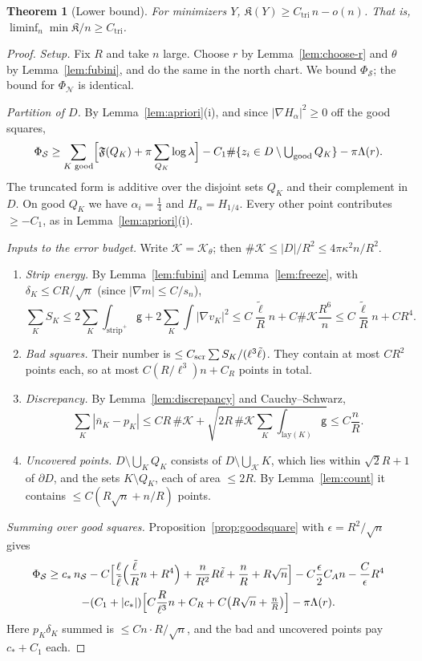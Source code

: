 \documentclass[11pt]{article}
\newtheorem{theorem}{Theorem}[section]
\theoremstyle{definition}
\theoremstyle{remark}
\begin{document}
\begin{theorem}[Lower bound]\label{thm:LB}
For minimizers $Y$, $\mathfrak K(Y)\ge C_{\mathrm{tri}}\,n-o(n)$. That is,
$\liminf_n\min\mathfrak K/n\ge C_{\mathrm{tri}}$.
\end{theorem}
\begin{proof}
\emph{Setup.} Fix $R$ and take $n$ large. Choose $r$ by Lemma~\ref{lem:choose-r} and $\theta$ by
Lemma~\ref{lem:fubini}, and do the same in the north chart. We bound $\Phi_{\mathcal S}$; the
bound for $\Phi_{\mathcal N}$ is identical.

\emph{Partition of $D$.} By Lemma~\ref{lem:apriori}(i), and since $|\nabla H_\alpha|^2\ge0$ off
the good squares,
\[
\Phi_{\mathcal S}\ge\sum_{K\text{ good}}\Bigl[\mathfrak F(Q_K)+\pi\sum_{Q_K}\log\lambda\Bigr]
-C_1\#\{z_i\in D\setminus\textstyle\bigcup_{\rm good}Q_K\}-\pi\Lambda(r).
\]
The truncated form is additive over the disjoint sets $Q_K$ and their complement in $D$. On good
$Q_K$ we have $\alpha_i=\tfrac14$ and $H_\alpha=H_{1/4}$. Every other point contributes $\ge-C_1$,
as in Lemma~\ref{lem:apriori}(i).

\emph{Inputs to the error budget.} Write $\mathcal K=\mathcal K_\theta$; then
$\#\mathcal K\le|D|/R^2\le4\pi\kappa^2n/R^2$.
\begin{enumerate}[label=(\alph*)]
\item \emph{Strip energy.} By Lemma~\ref{lem:fubini} and Lemma~\ref{lem:freeze}, with
  $\delta_K\le C R/\sqrt n$ (since $|\nabla m|\le C/s_n$),
  \[
  \sum_KS_K\le2\sum_K\int_{\mathrm{strip}^+}\mathsf g+2\sum_K\int|\nabla v_K|^2
  \le C\frac{\tilde\ell}Rn+C\#\mathcal K\frac{R^6}{n}\le C\frac{\tilde\ell}Rn+CR^4 .
  \]
\item \emph{Bad squares.} Their number is $\le C_{\rm scr}\sum S_K/(\ell^3\tilde\ell)$. They
  contain at most $CR^2$ points each, so at most $C(R/\ell^3)n+C_R$ points in total.
\item \emph{Discrepancy.} By Lemma~\ref{lem:discrepancy} and Cauchy--Schwarz,
  \[
  \sum_K|\bar n_K-p_K|\le CR\,\#\mathcal K+\sqrt{2R\,\#\mathcal K\sum_K\int_{\mathrm{lay}(K)}\mathsf g}\le C\frac nR .
  \]
\item \emph{Uncovered points.} $D\setminus\bigcup_KQ_K$ consists of $D\setminus\bigcup_{\mathcal K}K$,
  which lies within $\sqrt2R+1$ of $\partial D$, and the sets $K\setminus Q_K$, each of area
  $\le2R$. By Lemma~\ref{lem:count} it contains $\le C(R\sqrt n+n/R)$ points.
\end{enumerate}

\emph{Summing over good squares.} Proposition~\ref{prop:goodsquare} with $\epsilon=R^2/\sqrt n$
gives
\begin{multline*}
\Phi_{\mathcal S}\ge c_*\,n_{\mathcal S}
-C\Bigl[\frac\ell{\tilde\ell}\Bigl(\frac{\tilde\ell}Rn+R^4\Bigr)+\frac{n}{R^2}R\tilde\ell+\frac nR+R\sqrt n\Bigr]
-C\frac{\epsilon}{2}C_An-\frac C\epsilon R^4\\
-(C_1+|c_*|)\Bigl[C\frac R{\ell^3}n+C_R+C\bigl(R\sqrt n+\tfrac nR\bigr)\Bigr]-\pi\Lambda(r).
\end{multline*}
Here $p_K\delta_K$ summed is $\le Cn\cdot R/\sqrt n$, and the bad and uncovered points pay
$c_*+C_1$ each.


\end{proof}
\end{document}
